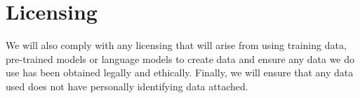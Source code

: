 \section{Licensing}

We will also comply with any licensing that will arise from using training data, pre-trained models or language models to create data and ensure any data we do use has been obtained legally and ethically. Finally, we will ensure that any data used does not have personally identifying data attached.
